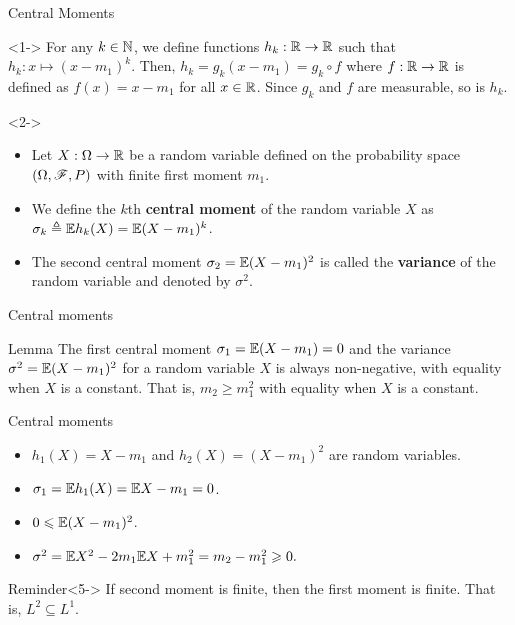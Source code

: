 \documentclass[12pt,aspectratio=169]{beamer}
\begin{document}
\begin{frame}{Central Moments}
\begin{Example}<1->
For any $k \in \mathbb{N}$, we define functions $h_k: \mathbb{R} \to \mathbb{R}$ such that $h_k: x \mapsto (x-m_1)^k$. 
Then, $h_k = g_k(x-m_1) = g_k\circ f$ where $f:\mathbb{R} \to\mathbb{R}$ is defined as $f(x) = x-m_1$ for all $x \in \mathbb{R}$. 
Since $g_k$ and $f$ are measurable, so is $h_k$. 
\end{Example}

\begin{Definition}<2->
\begin{itemize}
\item <2-> Let $X: \Omega \to \mathbb{R}$ be a random variable defined on the probability space $(\Omega, \mathscr{F}, P)$ with finite first moment $m_1$. 
\item <3-> We define the $k$th \textbf{central moment} of the random variable $X$ as $\sigma_k \triangleq \mathbb{E} h_k(X) = \mathbb{E} (X-m_1)^k$. 
\item <4-> The second central moment $\sigma_2 = \mathbb{E}(X-m_1)^2$ is called the \textbf{variance} of the random variable and denoted by $\sigma^2$. 
\end{itemize}
\end{Definition}
\end{frame}

\begin{frame}{Central moments}
\begin{block}{Lemma}
The first central moment $\sigma_1= \mathbb{E}(X-m_1) = 0$ and the variance $\sigma^2 = \mathbb{E}(X-m_1)^2$ for a random variable $X$ is always non-negative, 
with equality when $X$ is a constant. 
That is, $m_2 \ge m_1^2$ with equality when $X$ is a constant. 
\end{block}
\end{frame}

\begin{frame}{Central moments}
\begin{Proof}
\begin{itemize}
\item <1-> $h_1(X) = X- m_1$ and $h_2(X) = (X-m_1)^2$ are random variables. 
\item <2-> $\sigma_1 = \mathbb{E} h_1(X) = \mathbb{E} X - m_1 = 0$. 
\item <3-> $0 \leqslant \mathbb{E}(X-m_1)^2$.  
\item <4-> $
\sigma^2 = \mathbb{E} X^2 - 2m_1\mathbb{E} X + m_1^2 = m_2 - m_1^2 \geqslant 0.
$
\end{itemize}
\end{Proof}
\begin{block}{Reminder}<5->
If second moment is finite, then the first moment is finite. 
That is, $L^2 \subseteq L^1$. 
\end{block}
\end{frame}
\end{document}
